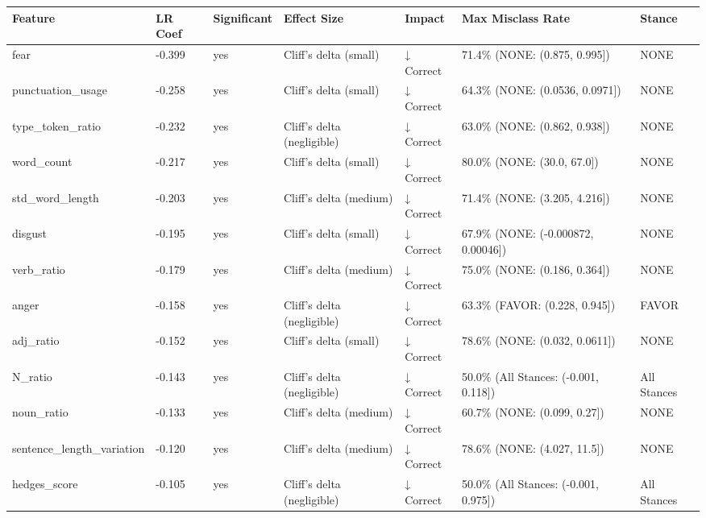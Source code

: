 \begin{tabular}{lllllll}
\toprule
Feature & LR Coef & Significant & Effect Size & Impact & Max Misclass Rate & Stance \\
\midrule
fear & -0.399 & yes & Cliff's delta (small) & ↓ Correct & 71.4\% (NONE: (0.875, 0.995]) & NONE \\
punctuation\_usage & -0.258 & yes & Cliff's delta (small) & ↓ Correct & 64.3\% (NONE: (0.0536, 0.0971]) & NONE \\
type\_token\_ratio & -0.232 & yes & Cliff's delta (negligible) & ↓ Correct & 63.0\% (NONE: (0.862, 0.938]) & NONE \\
word\_count & -0.217 & yes & Cliff's delta (small) & ↓ Correct & 80.0\% (NONE: (30.0, 67.0]) & NONE \\
std\_word\_length & -0.203 & yes & Cliff's delta (medium) & ↓ Correct & 71.4\% (NONE: (3.205, 4.216]) & NONE \\
disgust & -0.195 & yes & Cliff's delta (small) & ↓ Correct & 67.9\% (NONE: (-0.000872, 0.00046]) & NONE \\
verb\_ratio & -0.179 & yes & Cliff's delta (medium) & ↓ Correct & 75.0\% (NONE: (0.186, 0.364]) & NONE \\
anger & -0.158 & yes & Cliff's delta (negligible) & ↓ Correct & 63.3\% (FAVOR: (0.228, 0.945]) & FAVOR \\
adj\_ratio & -0.152 & yes & Cliff's delta (small) & ↓ Correct & 78.6\% (NONE: (0.032, 0.0611]) & NONE \\
N\_ratio & -0.143 & yes & Cliff's delta (negligible) & ↓ Correct & 50.0\% (All Stances: (-0.001, 0.118]) & All Stances \\
noun\_ratio & -0.133 & yes & Cliff's delta (medium) & ↓ Correct & 60.7\% (NONE: (0.099, 0.27]) & NONE \\
sentence\_length\_variation & -0.120 & yes & Cliff's delta (medium) & ↓ Correct & 78.6\% (NONE: (4.027, 11.5]) & NONE \\
hedges\_score & -0.105 & yes & Cliff's delta (negligible) & ↓ Correct & 50.0\% (All Stances: (-0.001, 0.975]) & All Stances \\
\bottomrule
\end{tabular}

